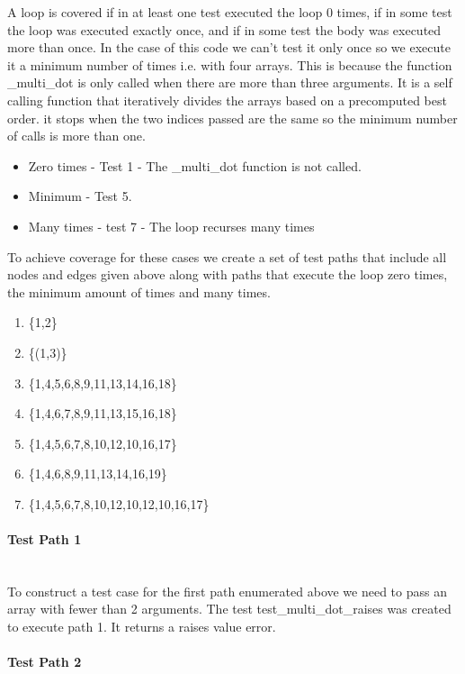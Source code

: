 A loop is covered if in at least one test executed the loop 0 times, if in some test the loop was executed exactly once, and if in some test the body was executed more than once. In the case of this code we can't test it only once so we execute it a minimum number of times i.e. with four arrays.
This is because the function \_multi\_dot is only called when there are more than three arguments. It is a self calling function that iteratively divides the arrays based on a precomputed best order. it stops when the two indices passed are the same so the minimum number of calls is more than one.
\begin{itemize}
\item Zero times - Test 1 - The \_multi\_dot function is not called.  
\item Minimum - Test 5.
\item Many times - test 7 - The loop recurses many times
\end{itemize}


To achieve coverage for these cases we create a set of test paths that include all nodes and edges given above along with paths that execute the loop zero times, the minimum amount of times and many times. 

\begin{enumerate}
\item \{1,2\}  
\item \{(1,3)\}
\item \{1,4,5,6,8,9,11,13,14,16,18\}
\item \{1,4,6,7,8,9,11,13,15,16,18\}
\item \{1,4,5,6,7,8,10,12,10,16,17\}
\item \{1,4,6,8,9,11,13,14,16,19\}
\item \{1,4,5,6,7,8,10,12,10,12,10,16,17\}
\end{enumerate}



\paragraph{Test Path 1}\\

To construct a test case for the first path enumerated above we need to pass an array with fewer than 2 arguments. 
The test test\_multi\_dot\_raises was created to execute path 1. It returns a raises value error.


\paragraph{Test Path 2}\\

